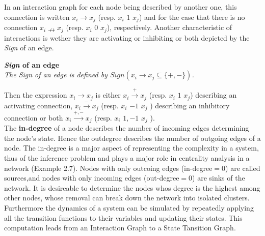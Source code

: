 In an interaction graph for each node being described by another one, this connection is written $x_{i}\rightarrow x_{j}$ (resp. $x_{i}$ $1$ $x_{j}$) and for the case that there is no connection $x_{i}\nrightarrow x_{j}$ (resp. $x_{i}$ $0$ $x_{j}$), respectively.
Another characteristic of interactions is wether they are activating or inhibiting or both depicted by the \textit{Sign} of an edge. 

\begin{defn}\textbf{\textit{Sign} of an edge}\\
\textit{The Sign of an edge is defined by $Sign(x_{i}\rightarrow x_{j} \subseteq \{+,-\})$.}
\end{defn}

Then the expression $x_{i}\rightarrow x_{j}$ is either $x_{i}\xrightarrow{+}  x_{j}$ (resp. $x_{i}$ $1$ $x_{j}$) describing an activating connection, $x_{i}\xrightarrow{-} x_{j}$ (resp. $x_{i}$ $-1$ $x_{j}$ ) describing an inhibitory connection or both $x_{i}\xrightarrow{+,-} x_{j}$ (resp. $x_{i}$ $1,-1$ $x_{j}$ ).\\


The \textbf{in-degree} of a node describes the number of incoming edges determining the node's state. Hence the outdegree describes the number of outgoing edges of a node. The in-degree is a major aspect of representing the complexity in a system, thus of the inference problem and plays a major role in centrality analysis in a network (Example 2.7).
Nodes with only outcoing edges (in-degree$=0$) are called sources,and nodes with only incoming edges (out-degree$=0$) are sinks of the network. It is desireable to determine the nodes whos degree is the highest among other nodes, whose removal can break down the network into isolated clusters.\\

Furthermore the dynamics of a system can be simulated by repeatedly applying all the transition functions to their variables and updating their states. This computation leads from an Interaction Graph to a State Tansition Graph.%

